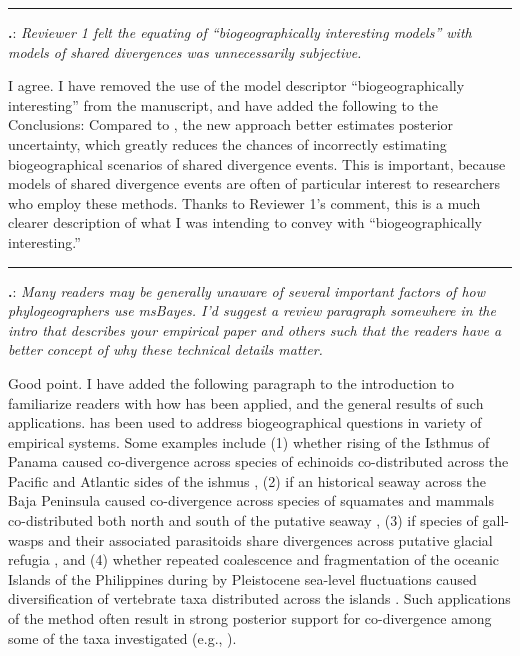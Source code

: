 \documentclass[12pt]{article}
\newcounter{commentCounter}
\newcommand{\revcomment}[1]{{\addtocounter{commentCounter}{1}}
    \medskip \hrule \noindent
\textbf{\arabic{section}.\arabic{commentCounter}}: {\sl #1}\par\xspace}
\newcommand{\response}[1]{{\addtolength{\leftskip}{0.25in} #1\par}\xspace}
\let\quoteOld\quote
\let\endquoteOld\endquote
\renewenvironment{quote}{\sffamily\small\quoteOld}{\endquoteOld}
\begin{document}
\revcomment{
    Reviewer 1 felt the equating of ``biogeographically interesting models''
    with models of shared divergences was unnecessarily subjective.
}
\response{
    I agree. I have removed the use of the model descriptor ``biogeographically
    interesting'' from the manuscript, and have added the following to the
    Conclusions:
    \begin{quote}
        Compared to \msb, the new approach better estimates posterior
        uncertainty, which greatly reduces the chances of incorrectly
        estimating biogeographical scenarios of shared divergence events.  This
        is important, because models of shared divergence events are often of
        particular interest to researchers who employ these methods.
    \end{quote}
    Thanks to Reviewer 1's comment, this is a much clearer description of what
    I was intending to convey with ``biogeographically interesting.''
}

\revcomment{
    Many readers may be generally unaware of several important factors of how
    phylogeographers use msBayes. I'd suggest a review paragraph somewhere in
    the intro that describes your empirical paper and others such that the
    readers have a better concept of why these technical details matter.
}
\response{
    Good point. I have added the following paragraph to the introduction to
    familiarize readers with how \msb has been applied, and the general results
    of such applications.
    \begin{quote}
        \msb has been used to address biogeographical questions in variety of
        empirical systems. Some examples include (1) whether rising of the
        Isthmus of Panama caused co-divergence across species of echinoids
        co-distributed across the Pacific and Atlantic sides of the ishmus
        \cite{Hickerson2006}, (2) if an historical seaway across the Baja
        Peninsula caused co-divergence across species of squamates and mammals
        co-distributed both north and south of the putative seaway
        \cite{Leache2007}, (3) if species of gall-wasps and their associated
        parasitoids share divergences across putative glacial refugia
        \cite{Stone2012}, and (4) whether repeated coalescence and
        fragmentation of the oceanic Islands of the Philippines during by
        Pleistocene sea-level fluctuations caused diversification of vertebrate
        taxa distributed across the islands \cite{Oaks2012}.  Such applications
        of the method often result in strong posterior support for
        co-divergence among some of the taxa investigated (e.g.,
        \cite{Barber2010,Carnaval2009,Chan2011,Hickerson2006,Leache2007,Plouviez2009,Stone2012,Voje2009,Oaks2012}).
    \end{quote}
}
\end{document}
